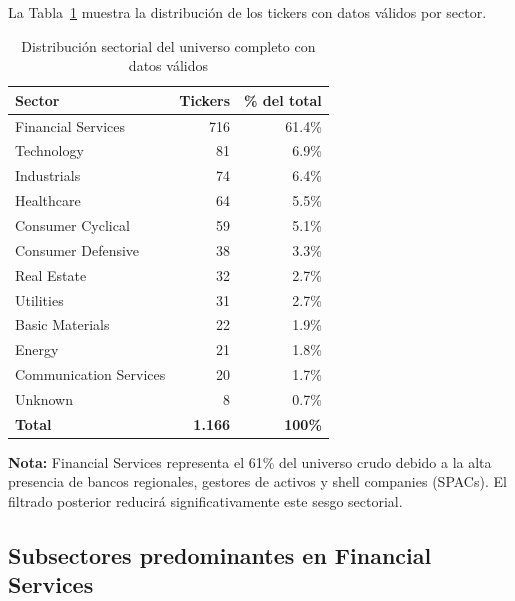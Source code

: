 La Tabla~\ref{tab:sectores} muestra la distribución de los tickers con datos
válidos por sector.

\begin{table}[H]
  \centering
  \caption{Distribución sectorial del universo completo con datos válidos}
  \label{tab:sectores}
  \begin{tabular}{lrr}
    \toprule
    \textbf{Sector} & \textbf{Tickers} & \textbf{\% del total} \\
    \midrule
    Financial Services      & 716 & 61.4\% \\
    Technology              &  81 &  6.9\% \\
    Industrials             &  74 &  6.4\% \\
    Healthcare              &  64 &  5.5\% \\
    Consumer Cyclical       &  59 &  5.1\% \\
    Consumer Defensive      &  38 &  3.3\% \\
    Real Estate             &  32 &  2.7\% \\
    Utilities               &  31 &  2.7\% \\
    Basic Materials         &  22 &  1.9\% \\
    Energy                  &  21 &  1.8\% \\
    Communication Services  &  20 &  1.7\% \\
    Unknown                 &   8 &  0.7\% \\
    \midrule
    \textbf{Total}          & \textbf{1.166} & \textbf{100\%} \\
    \bottomrule
  \end{tabular}
\end{table}

\noindent\textbf{Nota:} Financial Services representa el 61\% del universo crudo
debido a la alta presencia de bancos regionales, gestores de activos y
shell companies (SPACs). El filtrado posterior reducirá significativamente
este sesgo sectorial.

\subsection*{Subsectores predominantes en Financial Services}

